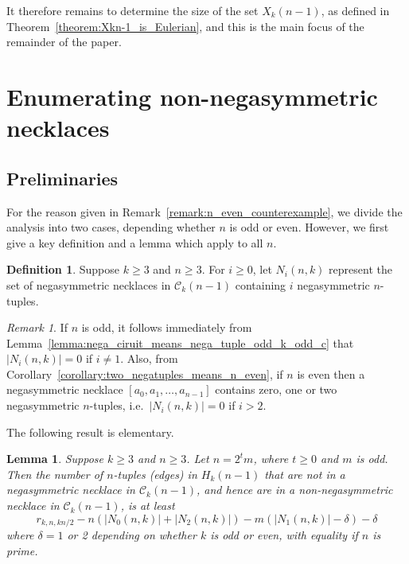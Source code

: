 \documentclass[a4paper,11pt]{article}
\theoremstyle{plain}
\newtheorem{lemma}{Lemma}[section]
\theoremstyle{definition}
\newtheorem{definition}{Definition}[section]
\theoremstyle{remark}
\newtheorem{remark}{Remark}[section]
\begin{document}
It therefore remains to determine the size of the set $X_k(n-1)$, as defined in
Theorem~\ref{theorem:Xkn-1_is_Eulerian}, and this is the main focus of the remainder
of the paper.


\section{Enumerating non-negasymmetric necklaces}  \label{section:circuit_enumeration}  \label{section:circuit_enumeration_kodd}

\subsection{Preliminaries}  \label{subsection:preliminaries}

For the reason given in Remark~\ref{remark:n_even_counterexample}, we divide the analysis into two
cases, depending whether $n$ is odd or even. However, we first give a key definition and a lemma
which apply to all $n$.

\begin{definition}
Suppose $k\geq3$ and $n\geq3$. For $i\geq0$, let $N_i(n,k)$ represent the set of negasymmetric
necklaces in $\mathcal{C}_k(n-1)$ containing $i$ negasymmetric $n$-tuples.
\end{definition}

\begin{remark}  \label{remark:Nink at most 2}
If $n$ is odd, it follows immediately from
Lemma~\ref{lemma:nega_ciruit_means_nega_tuple_odd_k_odd_c} that $|N_i(n,k)|=0$ if $i\neq 1$. Also,
from Corollary~\ref{corollary:two_negatuples_means_n_even}, if $n$ is even then a negasymmetric
necklace $[a_0,a_1,\ldots,a_{n-1}]$ contains zero, one or two negasymmetric $n$-tuples, i.e.\
$|N_i(n,k)|=0$ if $i>2$.
\end{remark}

The following result is elementary.

\begin{lemma}\label{lemma:bound on w n evenx}
Suppose $k\geq3$ and $n\geq3$.  Let $n=2^tm$, where $t\geq 0$ and $m$ is odd.  Then the number of
$n$-tuples (edges) in $H_k(n-1)$ that are not in a negasymmetric necklace in $\mathcal{C}_k(n-1)$,
and hence are in a non-negasymmetric necklace in $\mathcal{C}_k(n-1)$, is at least
\[ r_{k,n,kn/2} - n(|N_0(n,k)|+|N_2(n,k)|)-m(|N_1(n,k)|-\delta)-\delta \]
where $\delta=1$ or 2 depending on whether $k$ is odd or even, with equality if $n$ is prime.
\end{lemma}
\end{document}
